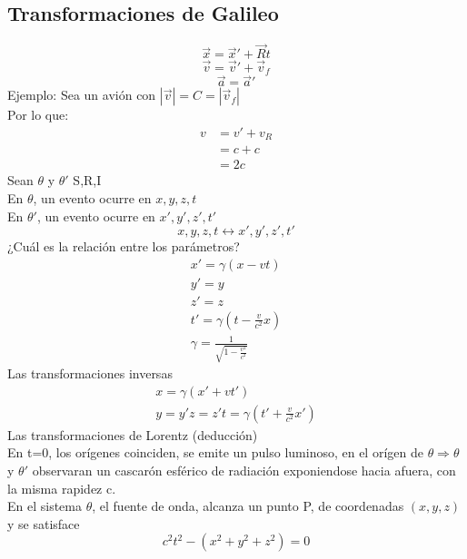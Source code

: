 \documentclass[12pt,letterpaper]{report}
\begin{document}
\subsection*{Transformaciones de Galileo}
\begin{equation}
    \vec{x}=\vec{x}'+\vec{R}t 
\end{equation}
\begin{equation}
    \vec{v}=\vec{v}'+\vec{v}_f 
\end{equation}
\begin{equation}
    \vec{a}=\vec{a}'
\end{equation}
Ejemplo: Sea un avión con $|\vec{v}|=C=|\vec{v}_f|$\\
Por lo que:
\begin{align*}
    v&=v'+v_R\\
     &=c+c\\
     &=2c
\end{align*}
Sean $\theta$ y $\theta'$ S,R,I\\
En $\theta$, un evento ocurre en $x,y,z,t$\\
En $\theta'$, un evento ocurre en $x',y',z',t'$\\
\begin{equation*}
    x,y,z,t \leftrightarrow x',y',z',t'
\end{equation*}
¿Cuál es la relación entre los parámetros?\\
\begin{eqnarray*}
x'=\gamma (x-vt)\\
y'=y\\
z'=z\\
t'=\gamma(t-\frac{v}{c^2}x)\\
\gamma=\frac{1}{\sqrt{1-\frac{v^2}{c^2}}}
\end{eqnarray*}
Las transformaciones inversas
\begin{eqnarray*}
    x=\gamma(x'+vt')\\
    y=y'
    z=z'
    t=\gamma(t'+\frac{v}{c^2}x')
\end{eqnarray*}
Las transformaciones de Lorentz (deducción)\\
En t=0, los orígenes coinciden, se emite un pulso luminoso, en el orígen de $\theta \Rightarrow \theta$ y $\theta'$ observaran un cascarón esférico de radiación exponiendose hacia afuera, con la misma rapidez c.\\
En el sistema $\theta$, el fuente de onda, alcanza un punto P, de coordenadas $(x,y,z)$ y se satisface 
\begin{equation*}
    c^2t^2-(x^2+y^2+z^2)=0
\end{equation*}
\end{document}
